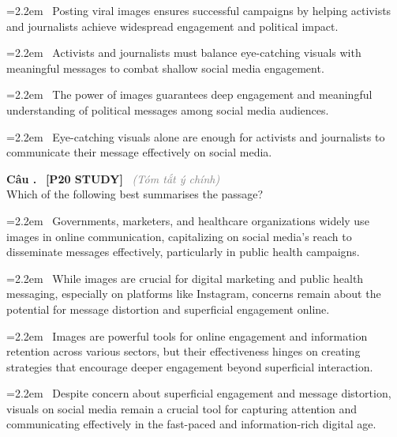 \documentclass[12pt,a4paper,twoside]{article}
\newcounter{qcounter}
\newcommand{\question}[2][]{%
    \stepcounter{qcounter}%
    \par\vspace{6pt}%
    \noindent\textcolor{primaryBlue}{\textbf{Câu \theqcounter.}}~%
    \textcolor{secondaryBlue}{\small\textbf{[P20 STUDY]}}~%
    \if\relax\detokenize{#1}\relax\else\textcolor{gray}{\small\textit{(#1)}}~\fi\\[1pt]
    \noindent #2%
}
\newcommand{\choiceitem}[2]{%
    \tikz[baseline=-0.5ex]{%
        \node[draw=primaryBlue, circle, minimum size=1.5em, inner sep=0pt, thick] {\textbf{#1}};%
    }~#2%
}
\begin{document}
\par\vspace{4pt}
\noindent\hangindent=2.2em\choiceitem{A}{Posting viral images ensures successful campaigns by helping activists and journalists achieve widespread engagement and political impact.}\par\vspace{4pt}
\noindent\hangindent=2.2em\choiceitem{B}{Activists and journalists must balance eye-catching visuals with meaningful messages to combat shallow social media engagement.}\par\vspace{4pt}
\noindent\hangindent=2.2em\choiceitem{C}{The power of images guarantees deep engagement and meaningful understanding of political messages among social media audiences.}\par\vspace{4pt}
\noindent\hangindent=2.2em\choiceitem{D}{Eye-catching visuals alone are enough for activists and journalists to communicate their message effectively on social media.}\par\vspace{4pt}

\question[Tóm tắt ý chính]{Which of the following best summarises the passage?}

\par\vspace{4pt}
\noindent\hangindent=2.2em\choiceitem{A}{Governments, marketers, and healthcare organizations widely use images in online communication, capitalizing on social media’s reach to disseminate messages effectively, particularly in public health campaigns.}\par\vspace{4pt}
\noindent\hangindent=2.2em\choiceitem{B}{While images are crucial for digital marketing and public health messaging, especially on platforms like Instagram, concerns remain about the potential for message distortion and superficial engagement online.}\par\vspace{4pt}
\noindent\hangindent=2.2em\choiceitem{C}{Images are powerful tools for online engagement and information retention across various sectors, but their effectiveness hinges on creating strategies that encourage deeper engagement beyond superficial interaction.}\par\vspace{4pt}
\noindent\hangindent=2.2em\choiceitem{D}{Despite concern about superficial engagement and message distortion, visuals on social media remain a crucial tool for capturing attention and communicating effectively in the fast-paced and information-rich digital age.}\par\vspace{4pt}
\end{document}

